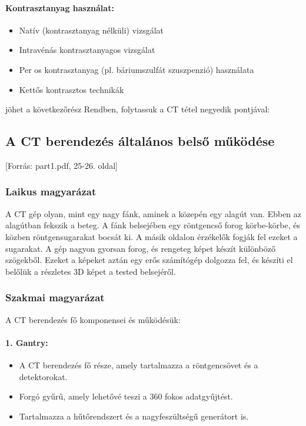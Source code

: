 \documentclass[a4paper,12pt]{article}
\begin{document}
\paragraph{Kontrasztanyag használat:} \begin{itemize} \item Natív (kontrasztanyag nélküli) vizsgálat \item Intravénás kontrasztanyagos vizsgálat \item Per os kontrasztanyag (pl. báriumszulfát szuszpenzió) használata \item Kettős kontrasztos technikák \end{itemize}

jöhet a következőrész
Rendben, folytassuk a CT tétel negyedik pontjával:

\subsection{A CT berendezés általános belső működése} [Forrás: part1.pdf, 25-26. oldal]

\subsubsection{Laikus magyarázat} A CT gép olyan, mint egy nagy fánk, aminek a közepén egy alagút van. Ebben az alagútban fekszik a beteg. A fánk belsejében egy röntgencső forog körbe-körbe, és közben röntgensugarakat bocsát ki. A másik oldalon érzékelők fogják fel ezeket a sugarakat. A gép nagyon gyorsan forog, és rengeteg képet készít különböző szögekből. Ezeket a képeket aztán egy erős számítógép dolgozza fel, és készíti el belőlük a részletes 3D képet a tested belsejéről.

\subsubsection{Szakmai magyarázat} A CT berendezés fő komponensei és működésük:

\paragraph{1. Gantry:} \begin{itemize} \item A CT berendezés fő része, amely tartalmazza a röntgencsövet és a detektorokat. \item Forgó gyűrű, amely lehetővé teszi a 360 fokos adatgyűjtést. \item Tartalmazza a hűtőrendszert és a nagyfeszültségű generátort is. \end{itemize}
\end{document}
